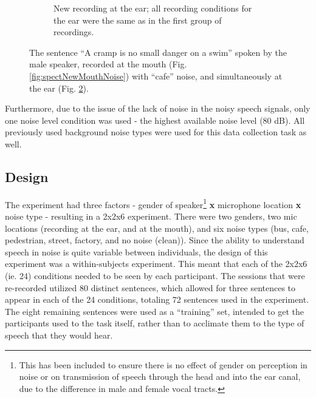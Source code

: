 \documentclass[dissertation,copyright]{uathesis}
\begin{document}
\begin{figure}
\begin{subfigure}{0.5\textwidth}
  \caption{New recording at the ear; all recording conditions for the ear were the same as in the first group of recordings.}
  \label{fig:spectNewEarNoise}
\end{subfigure}
\caption{The sentence ``A cramp is no small danger on a swim'' spoken by the male speaker, recorded at the mouth (Fig. \ref{fig:spectNewMouthNoise}) with ``cafe'' noise, and simultaneously at the ear (Fig. \ref{fig:spectNewEarNoise}).}
\end{figure}


Furthermore, due to the issue of the lack of noise in the noisy speech signals, only one noise level condition was used - the highest available noise level (80 dB).  All previously used background noise types were used for this data collection task as well.


\subsection{Design}
\label{chap4:methods:design}

The experiment had three factors - gender of speaker\footnote{This has been included to ensure there is no effect of gender on perception in noise or on transmission of speech through the head and into the ear canal, due to the difference in male and female vocal tracts.} \textbf{x} microphone location \textbf{x} noise type - resulting in a 2x2x6 experiment.  There were two genders, two mic locations (recording at the ear, and at the mouth), and six noise types (bus, cafe, pedestrian, street, factory, and no noise (clean)).  Since the ability to understand speech in noise is quite variable between individuals, the design of this experiment was a within-subjects experiment.  This meant that each of the 2x2x6 (ie. 24) conditions needed to be seen by each participant.  The sessions that were re-recorded utilized 80 distinct sentences, which allowed for three sentences to appear in each of the 24 conditions, totaling 72 sentences used in the experiment.  The eight remaining sentences were used as a ``training'' set, intended to get the participants used to the task itself, rather than to acclimate them to the type of speech that they would hear.
\end{document}
